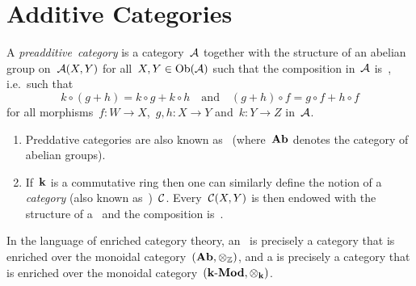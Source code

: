 \section{Additive Categories}


\begin{definition}
  A \emph{preadditive~category} is a category~$\mathcal{A}$ together with the structure of an abelian group on~$\mathcal{A}(X,Y)$ for all~$X, Y \in \operatorname{Ob}(\mathcal{A})$ such that the composition in~$\mathcal{A}$ is~{\Zbilin}, i.e.\ such that
  \[
    k \circ (g + h) = k \circ g + k \circ h
    \quad\text{and}\quad
    (g + h) \circ f = g \circ f + h \circ f
  \]
  for all morphisms~$f \colon W \to X$,~$g, h \colon X \to Y$ and~$k \colon Y \to Z$ in~$\mathcal{A}$.
\end{definition}


\begin{remark}
  \leavevmode
  \begin{enumerate}
    \item
      Preddative categories are also known as~\emph{} (where~$\mathbf{Ab}$ denotes the category of abelian groups).
    \item
      If~$\kf$ is a commutative ring then one can similarly define the notion of a \emph{{\preklin} category} (also known as~\emph{})~$\mathcal{C}$.
      Every~$\mathcal{C}(X,Y)$ is then endowed with the structure of a~{\module{$\kf$}} and the composition is~{\kbilin}.
  \end{enumerate}
\end{remark}


\begin{remark*}
  In the language of enriched category theory, an~ is precisely a category that is enriched over the monoidal category~$(\mathbf{Ab},{\otimes_{\mathbb{Z}}})$, and a  is precisely a category that is enriched over the monoidal category~$(\text{$\mathbf{k}$-$\mathbf{Mod}$}, {\otimes_{\mathbf{k}}})$.
\end{remark*}



